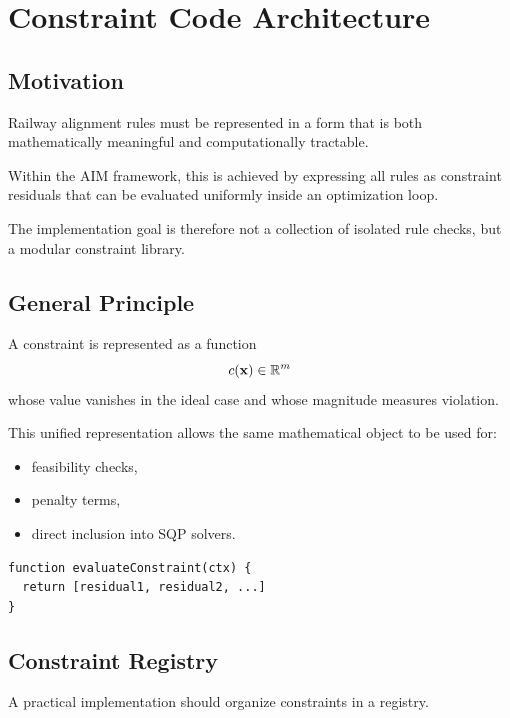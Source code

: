 
\chapter{Constraint Code Architecture}

\section*{Motivation}

Railway alignment rules must be represented in a form that is both
mathematically meaningful and computationally tractable.

Within the AIM framework, this is achieved by expressing all rules as
constraint residuals that can be evaluated uniformly inside an
optimization loop.

The implementation goal is therefore not a collection of isolated rule
checks, but a modular constraint library.

\section{General Principle}

\begin{definition}
A constraint is represented as a function
\[
c(\mathbf{x}) \in \mathbb{R}^m
\]
whose value vanishes in the ideal case and whose magnitude measures
violation.
\end{definition}

This unified representation allows the same mathematical object to be
used for:
\begin{itemize}
\item feasibility checks,
\item penalty terms,
\item direct inclusion into SQP solvers.
\end{itemize}

\begin{verbatim}
function evaluateConstraint(ctx) {
  return [residual1, residual2, ...]
}
\end{verbatim}

\section{Constraint Registry}

A practical implementation should organize constraints in a registry.

